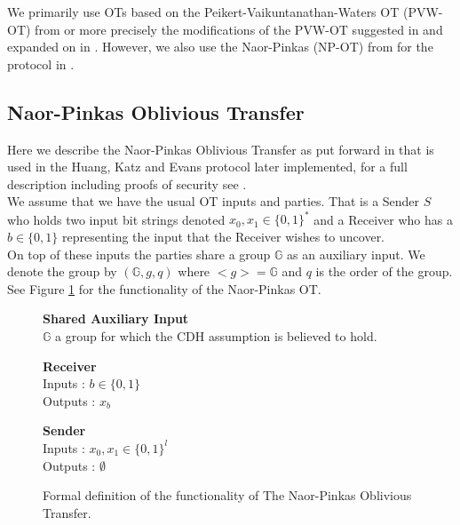 \documentclass[ %
                    author={Nicholas Tutte},
                supervisor={Prof. Nigel Smart},
                    degree={MEng},
                     title={Secure Two Party Computation},
                  subtitle={A practical comparison of recent protocols},
                      type={Research - GG1K},
                      year={2015} ]{dissertation}
\begin{document}
			We primarily use OTs based on the Peikert-Vaikuntanathan-Waters OT (PVW-OT) from \cite{PVW_OT_2008} or more precisely the modifications of the PVW-OT suggested in \cite{LindellAndPinkas2011} and expanded on in \cite{Lindell_CnC_2013}. However, we also use the Naor-Pinkas (NP-OT) from \cite{NaorPinkasOT2001} for the protocol in \cite{Katz_Symm_CnC_2013}.


			\subsection{Naor-Pinkas Oblivious Transfer} \label{sub:NaorPinkasOT}

				Here we describe the Naor-Pinkas Oblivious Transfer as put forward in \cite{Katz_Symm_CnC_2013} that is used in the Huang, Katz and Evans protocol later implemented, for a full description including proofs of security see \cite{NaorPinkasOT2001}.\\

				We assume that we have the usual OT inputs and parties. That is a Sender $S$ who holds two input bit strings denoted $x_0, x_1 \in \{0, 1\}^*$ and a Receiver who has a $b \in \{0, 1\}$ representing the  input that the Receiver wishes to uncover.\\

				On top of these inputs the parties share a group $\mathbb{G}$ as an auxiliary input. We denote the group by $(\mathbb{G}, g, q)$ where $<g> = \mathbb{G}$ and $q$ is the order of the group.\\ %

				See Figure \ref{fig:NPOT_Functionality} for the functionality of the Naor-Pinkas OT.\\


				\begin{figure}[!htb]
					\centering
					
					\textbf{Shared Auxiliary Input}\\
					$\mathbb{G}$ a group for which the CDH assumption is believed to hold.\\
					\vspace{0.3cm}
					\begin{minipage}{0.45\textwidth}
						\centering
						\textbf{Receiver}\\
						Inputs : $b \in \{0, 1\}$\\
						Outputs : $x_b$\\
					\end{minipage}
					\begin{minipage}{0.45\textwidth}
						\centering
						\textbf{Sender}\\
						Inputs : $x_0, x_1 \in \{0, 1\}^l$\\
						Outputs : $\emptyset$\\
					\end{minipage}

					\caption{ Formal definition of the functionality of The Naor-Pinkas Oblivious Transfer.\label{fig:NPOT_Functionality}}
				\end{figure}
\end{document}
